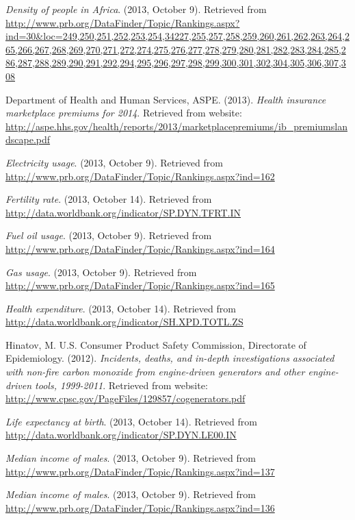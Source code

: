 \documentclass[]{book}
\begin{document}
\emph{Density of people in Africa}. (2013, October 9). Retrieved from
\href{http://www.prb.org/DataFinder/Topic/Rankings.aspx?ind=30\&loc=249,250,251,252,253,254,34227,255,257,258,259,260,261,262,263,264,265,266,267,268,269,270,271,272,274,275,276,277,278,279,280,281,282,283,284,285,286,287,288,289,290,291,292,294,295,296,297,298,2}{http://www.prb.org/DataFinder/Topic/Rankings.aspx?ind=30\&loc=249,250,251,252,253,254,34227,255,257,258,259,260,261,262,263,264,265,266,267,268,269,270,271,272,274,275,276,277,278,279,280,281,282,283,284,285,286,287,288,289,290,291,292,294,295,296,297,298,299,300,301,302,304,305,306,307,308}

Department of Health and Human Services, ASPE. (2013). \emph{Health insurance
marketplace premiums for 2014}. Retrieved from website:
\url{http://aspe.hhs.gov/health/reports/2013/marketplacepremiums/ib_premiumslandscape.pdf}

\emph{Electricity usage}. (2013, October 9). Retrieved from
\url{http://www.prb.org/DataFinder/Topic/Rankings.aspx?ind=162}

\emph{Fertility rate}. (2013, October 14). Retrieved from
\url{http://data.worldbank.org/indicator/SP.DYN.TFRT.IN}

\emph{Fuel oil usage}. (2013, October 9). Retrieved from
\url{http://www.prb.org/DataFinder/Topic/Rankings.aspx?ind=164}

\emph{Gas usage}. (2013, October 9). Retrieved from
\url{http://www.prb.org/DataFinder/Topic/Rankings.aspx?ind=165}

\emph{Health expenditure}. (2013, October 14). Retrieved from
\url{http://data.worldbank.org/indicator/SH.XPD.TOTL.ZS}

Hinatov, M. U.S. Consumer Product Safety Commission, Directorate of
Epidemiology. (2012). \emph{Incidents, deaths, and in-depth investigations
associated with non-fire carbon monoxide from engine-driven generators
and other engine-driven tools, 1999-2011}. Retrieved from website:
\url{http://www.cpsc.gov/PageFiles/129857/cogenerators.pdf}

\emph{Life expectancy at birth}. (2013, October 14). Retrieved from
\url{http://data.worldbank.org/indicator/SP.DYN.LE00.IN}

\emph{Median income of males}. (2013, October 9). Retrieved from
\url{http://www.prb.org/DataFinder/Topic/Rankings.aspx?ind=137}

\emph{Median income of males}. (2013, October 9). Retrieved from
\url{http://www.prb.org/DataFinder/Topic/Rankings.aspx?ind=136}
\end{document}
